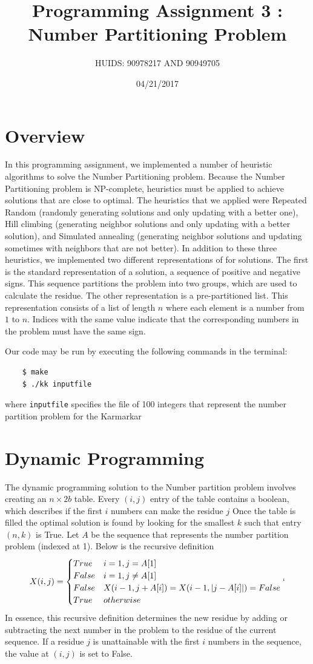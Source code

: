 \documentclass[a4paper]{article}
\title{Programming Assignment 3 : Number Partitioning Problem}
\author{HUIDS: 90978217 AND 90949705}
\date{04/21/2017}
\begin{document}
	
	\maketitle
	
	\section{Overview}
	In this programming assignment, we implemented a number of heuristic algorithms to solve the Number Partitioning problem. Because the Number Partitioning problem is NP-complete, heuristics must be applied to achieve solutions that are close to optimal. The heuristics that we applied were Repeated Random (randomly generating solutions and only updating with a better one), Hill climbing (generating neighbor solutions and only updating with a better solution), and Simulated annealing (generating neighbor solutions and updating sometimes with neighbors that are not better). In addition to these three heuristics, we implemented two different representations of for solutions. The first is the standard representation of a solution, a sequence of positive and negative signs. This sequence partitions the problem into two groups, which are used to calculate the residue. The other representation is a pre-partitioned list. This representation consists of a list of length $n$ where each element is a number from $1$ to $n$. Indices with the same value indicate that the corresponding numbers in the problem must have the same sign.
	
	Our code may be run by executing the following commands in the terminal:
	\begin{verbatim}
	$ make
	$ ./kk inputfile
	\end{verbatim}
	where \texttt{inputfile} specifies the file of 100 integers that represent the number partition problem for the Karmarkar 
	
	\section{Dynamic Programming}
	The dynamic programming solution to the Number partition problem involves creating an $n \times 2b$ table. Every $(i,j)$ entry of the table contains a boolean, which describes if the first $i$ numbers can make the residue $j$  Once the table is filled the optimal solution is found by looking for the smallest $k$ such that entry $(n,k)$ is True. Let $A$ be the sequence that represents the number partition problem (indexed at 1). Below is the recursive definition
	\[X(i,j) = 
	\begin{cases}
	True & i = 1, j = A[1]\\
	False & i = 1, j \neq A[1] \\ 
	False & X(i-1, j + A[i]) = X(i-1, |j - A[i]|) = False \\
	True & otherwise
	\end{cases}`
	\]
	In essence, this recursive definition determines the new residue by adding or subtracting the next number in the problem to the residue of the current sequence. If a residue $j$ is unattainable with the first $i$ numbers in the sequence, the value at $(i,j)$ is set to False. 
	
\end{document}

